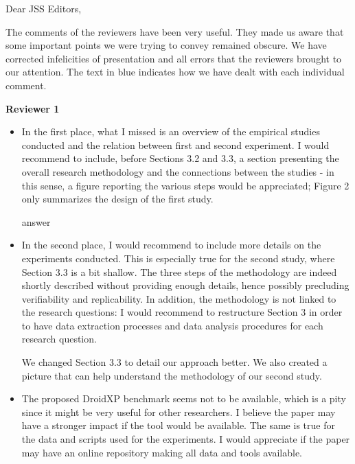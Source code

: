 \documentclass[12pt,english]{scrlttr2}
\begin{document}
\begin{letter}{Dear JSS Editors,}
  
\opening{The comments of the reviewers have been very useful. They made us aware that some important points we were trying to convey remained obscure. We have corrected infelicities of presentation and all errors that the reviewers brought to our attention. The text in {\color{blue}blue} indicates how we have dealt with each individual comment.}


{\bf Reviewer 1}

\begin{itemize}
\item In the first place, what I missed is an overview of the empirical studies conducted and the relation between 
first and second experiment. I would recommend to include, before Sections 3.2 and 3.3, a section 
presenting the overall research methodology and the connections between the studies - in this sense, 
a figure reporting the various steps would be appreciated; Figure 2 only summarizes the design of the first study.


\vspace{0.2cm}
  
{\color{blue}{\bf Answer.} answer}

\vspace{0.2cm}

\item In the second place, I would recommend to include more details on the experiments conducted. This is especially 
true for the second study, where Section 3.3 is a bit shallow. The three steps of the methodology are indeed shortly 
described without providing enough details, hence possibly precluding verifiability and replicability. In addition, the 
methodology is not linked to the research questions: I would recommend to restructure Section 3 in order to have 
data extraction processes and data analysis procedures for each research question.


\vspace{0.2cm}

{\color{blue}{\bf Answer:} We changed Section 3.3 to detail our approach better. We also created a picture that can help understand the methodology of our second study.}  

\vspace{0.2cm}

\item The proposed DroidXP benchmark seems not to be available, which is a pity since it might be very useful for other 
researchers. I believe the paper may have a stronger impact if the tool would be available. The same is true for the 
data and scripts used for the experiments. I would appreciate if the paper may have an online repository making all 
data and tools available.



\end{itemize}
\end{letter}
\end{document}
